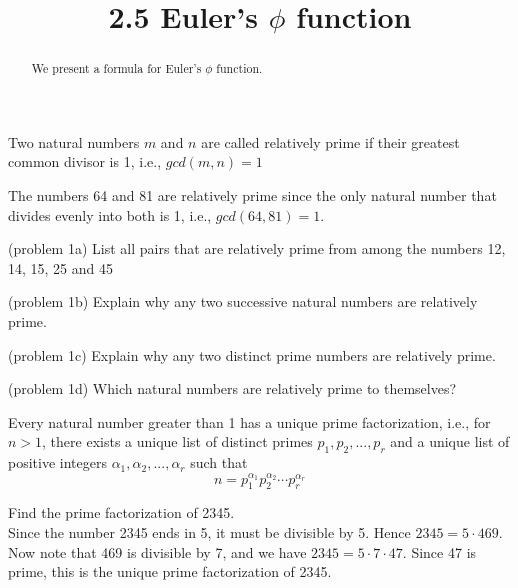 \documentclass[handout]{ximera}
\title{2.5 Euler's $\phi$ function}
\begin{document}
\begin{abstract}
We present a formula for Euler's $\phi$ function.
\end{abstract}

\maketitle


\begin{definition}
Two natural numbers $m$ and $n$ are called relatively prime if their greatest common divisor is 1, i.e., $gcd(m,n) = 1$
\end{definition}

\begin{example}[example 1]
The numbers 64 and 81 are relatively prime since the only natural number that divides evenly into both is 1, i.e., $gcd(64,81) = 1$.
\end{example}

\begin{problem}(problem 1a)
List all pairs that are relatively prime from among the numbers 12, 14, 15, 25 and 45
\end{problem}

\begin{problem}(problem 1b)
Explain why any two successive natural numbers are relatively prime.
\end{problem}

\begin{problem}(problem 1c)
Explain why any two distinct prime numbers are relatively prime.
\end{problem}

\begin{problem}(problem 1d)
Which natural numbers are relatively prime to themselves?
\end{problem}

\begin{theorem}
Every natural number greater than 1 has a unique prime factorization, i.e., for $n >1$, there exists a 
unique list of distinct primes
$p_1, p_2, ..., p_r$ and a unique list of positive integers $\alpha_1, \alpha_2, ..., \alpha_r$ such that
\[
n = p_1^{\alpha_1}p_2^{\alpha_2}\cdots p_r^{\alpha_r}
\]
\end{theorem}


\begin{example}[example 2]
Find the prime factorization of 2345.\\
Since the number 2345 ends in 5, it must be divisible by 5.  Hence $2345 = 5 \cdot 469$. Now note that 469 is divisible by 7,
and we have $2345 = 5 \cdot 7 \cdot 47$. Since 47 is prime, this is the unique prime factorization of 2345.
\end{example}
\end{document}
